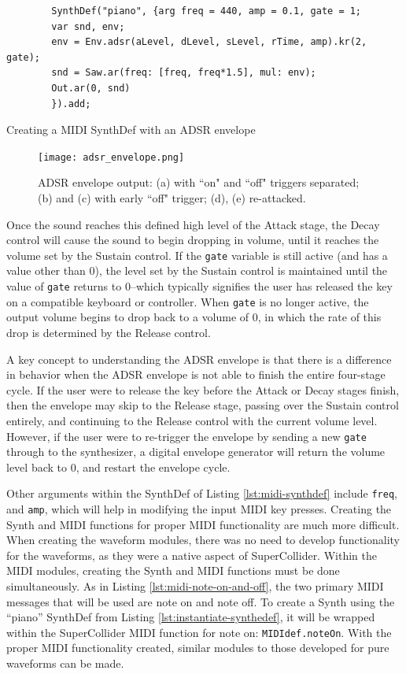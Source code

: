 \begin{listing}
	\begin{lstlisting}
		SynthDef("piano", {arg freq = 440, amp = 0.1, gate = 1;
		var snd, env;
		env = Env.adsr(aLevel, dLevel, sLevel, rTime, amp).kr(2, gate);
		snd = Saw.ar(freq: [freq, freq*1.5], mul: env);
		Out.ar(0, snd)
		}).add;
	\end{lstlisting}
	\caption{Creating a MIDI SynthDef with an ADSR envelope}
	\label{lst:midi-synthdef}	
\end{listing}

\begin{figure}
  \centering
  \texttt{[image: adsr\_envelope.png]}
  \caption{ADSR envelope output: (a) with ``on" and ``off" triggers separated; (b) and (c) with early ``off" trigger; (d), (e) re-attacked.} \cite{Puckette_2007}
  \label{fig:adsr-envelope}
\end{figure}

Once the sound reaches this defined high level of the Attack stage, the Decay control will cause the sound to begin dropping in volume, until it reaches the volume set by the Sustain control. If the \texttt{gate} variable is still active (and has a value other than 0), the level set by the Sustain control is maintained until the value of \texttt{gate} returns to 0--which typically signifies the user has released the key on a compatible keyboard or controller. When \texttt{gate} is no longer active, the output volume begins to drop back to a volume of 0, in which the rate of this drop is determined by the Release control. 

A key concept to understanding the ADSR envelope is that there is a difference in behavior when the ADSR envelope is not able to finish the entire four-stage cycle. If the user were to release the key before the Attack or Decay stages finish, then the envelope may skip to the Release stage, passing over the Sustain control entirely, and continuing to the Release control with the current volume level. However, if the user were to re-trigger the envelope by sending a new \texttt{gate} through to the synthesizer, a digital envelope generator will return the volume level back to 0, and restart the envelope cycle.

Other arguments within the SynthDef of Listing \ref{lst:midi-synthdef} include \texttt{freq}, and \texttt{amp}, which will help in modifying the input MIDI key presses. Creating the Synth and MIDI functions for proper MIDI functionality are much more difficult. When creating the waveform modules, there was no need to develop functionality for the waveforms, as they were a native aspect of SuperCollider. Within the MIDI modules, creating the Synth and MIDI functions must be done simultaneously. As in Listing \ref{lst:midi-note-on-and-off}, the two primary MIDI messages that will be used are note on and note off. To create a Synth using the ``piano'' SynthDef from Listing \ref{lst:instantiate-synthedef}, it will be wrapped within the SuperCollider MIDI function for note on: \texttt{MIDIdef.noteOn}. With the proper MIDI functionality created, similar modules to those developed for pure waveforms can be made.

